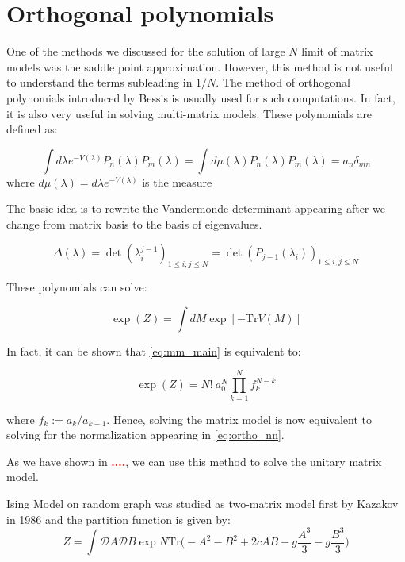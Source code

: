 \documentclass[11pt]{article}
\newcommand{\TODO}[1]{\textcolor{red}{{\bf #1}}}
\begin{document}
\section{Orthogonal polynomials}
One of the methods we discussed for the solution of 
large $N$ limit of matrix models was the saddle point approximation. 
However, this method is not useful 
to understand the terms subleading in $1/N$. The method 
of orthogonal polynomials introduced by Bessis \cite{Bessis:1979is} 
is usually used for such computations. In fact, it is also very useful in 
solving multi-matrix models. These polynomials are defined as:

\begin{equation}
	\label{eq:ortho_nn} 
	\int d\lambda e^{-V(\lambda)} P_{n}(\lambda)
	P_{m}(\lambda) = \int d \mu(\lambda) P_{n}(\lambda)
	P_{m}(\lambda) = a_{n} \delta_{mn} 
\end{equation}
where $d \mu(\lambda) = d\lambda e^{-V(\lambda)}$ is the measure  

The basic idea is to rewrite the Vandermonde determinant appearing after we change from matrix basis to the basis of eigenvalues. 

\begin{equation}
	\Delta(\lambda) = \det(\lambda_{i}^{j-1})_{1 \le i, j \le N} = \det(P_{j-1}(\lambda_i))_{1 \le i, j \le N}
\end{equation}


These polynomials can solve:

\begin{equation}
	\label{eq:mm_main}
	\exp(Z) = \int dM \exp[-\mbox{Tr} V(M)] 
\end{equation}

In fact, it can be shown that \ref{eq:mm_main} is equivalent to:

\begin{equation}
	\exp(Z) = N! ~ a_{0}^{N} \prod_{k=1}^{N} f_{k}^{N-k}
\end{equation}

where $f_{k} := a_{k}/a_{k-1}$. Hence, solving the matrix model is now equivalent to solving for the normalization appearing in \ref{eq:ortho_nn}. 

As we have shown in \TODO{....}, we can use this method to solve the unitary matrix model.


Ising Model on random graph was studied as two-matrix model first by Kazakov in 1986 and the partition function is given by:
\begin{equation}
	\label{eq:Kaz1} 
	Z = \int \mathcal{D}A \mathcal{D}B \exp N \mbox{Tr} \Bigg(-A^2 -B^2 + 2c AB -g \frac{A^3}{3} - g\frac{B^3}{3}  \Bigg)
\end{equation}
\end{document}
